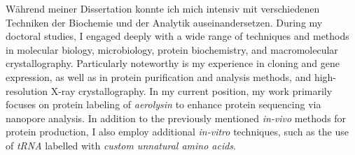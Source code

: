 
    {Während meiner Dissertation konnte ich mich intensiv mit verschiedenen Techniken der Biochemie und der Analytik auseinandersetzen. }
    {During my doctoral studies, I engaged deeply with a wide range of techniques and methods in molecular biology, microbiology, protein biochemistry, and macromolecular crystallography. Particularly noteworthy is my experience in cloning and gene expression, as well as in protein purification and analysis methods, and high-resolution X-ray crystallography. In my current position, my work primarily focuses on protein labeling of \textit{aerolysin} to enhance protein sequencing via nanopore analysis. In addition to the previously mentioned \textit{in-vivo} methods for protein production, I also employ additional \textit{in-vitro} techniques, such as the use of \textit{tRNA} labelled with  \textit{custom unnatural amino acids}.}\par
